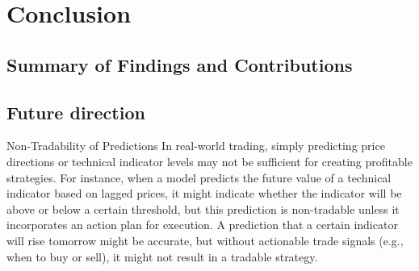 \chapter{Conclusion}

\section{Summary of Findings and Contributions} 


\section{Future direction} 
Non-Tradability of Predictions
In real-world trading, simply predicting price directions or technical indicator levels may not be sufficient for creating profitable strategies. For instance, when a model predicts the future value of a technical indicator based on lagged prices, it might indicate whether the indicator will be above or below a certain threshold, but this prediction is non-tradable unless it incorporates an action plan for execution. A prediction that a certain indicator will rise tomorrow might be accurate, but without actionable trade signals (e.g., when to buy or sell), it might not result in a tradable strategy.
